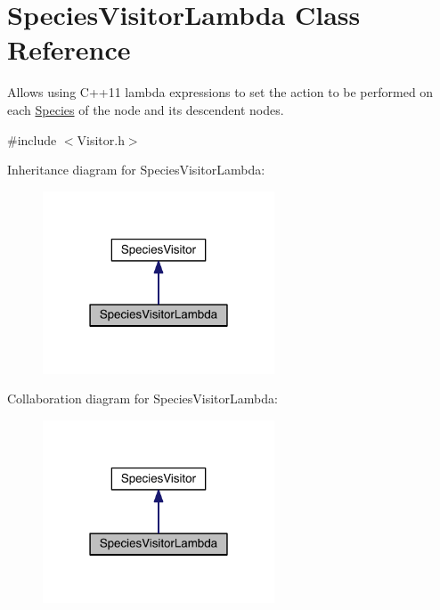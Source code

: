 \hypertarget{classSpeciesVisitorLambda}{\section{Species\+Visitor\+Lambda Class Reference}
\label{classSpeciesVisitorLambda}
}


Allows using C++11 lambda expressions to set the action to be performed on each \hyperlink{classSpecies}{Species} of the node and its descendent nodes.  




{\ttfamily \#include $<$Visitor.\+h$>$}



Inheritance diagram for Species\+Visitor\+Lambda\+:\nopagebreak
\begin{figure}[H]
\begin{center}
\leavevmode
\includegraphics[width=195pt]{classSpeciesVisitorLambda__inherit__graph}
\end{center}
\end{figure}


Collaboration diagram for Species\+Visitor\+Lambda\+:\nopagebreak
\begin{figure}[H]
\begin{center}
\leavevmode
\includegraphics[width=195pt]{classSpeciesVisitorLambda__coll__graph}
\end{center}
\end{figure}
